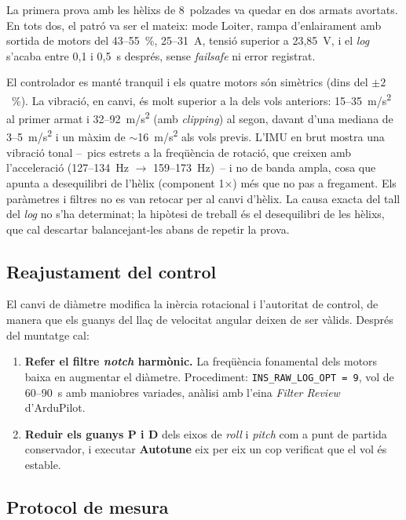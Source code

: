 La primera prova amb les hèlixs de 8~polzades va quedar en dos armats avortats. En tots dos, el patró va ser el mateix: mode Loiter, rampa d'enlairament amb sortida de motors del 43--55~\%, 25--31~A, tensió superior a 23,85~V, i el \emph{log} s'acaba entre 0,1 i 0,5~s després, sense \emph{failsafe} ni error registrat.

El controlador es manté tranquil i els quatre motors són simètrics (dins del $\pm 2$~\%). La vibració, en canvi, és molt superior a la dels vols anteriors: 15--35~m/s\textsuperscript{2} al primer armat i 32--92~m/s\textsuperscript{2} (amb \emph{clipping}) al segon, davant d'una mediana de 3--5~m/s\textsuperscript{2} i un màxim de $\sim$16~m/s\textsuperscript{2} als vols previs. L'IMU en brut mostra una vibració tonal --~pics estrets a la freqüència de rotació, que creixen amb l'acceleració (127--134~Hz $\rightarrow$ 159--173~Hz)~-- i no de banda ampla, cosa que apunta a desequilibri de l'hèlix (component 1$\times$) més que no pas a fregament. Els paràmetres i filtres no es van retocar per al canvi d'hèlix. La causa exacta del tall del \emph{log} no s'ha determinat; la hipòtesi de treball és el desequilibri de les hèlixs, que cal descartar balancejant-les abans de repetir la prova.

\subsection{Reajustament del control}
\label{subsec:propulsor-control}

El canvi de diàmetre modifica la inèrcia rotacional i l'autoritat de control, de manera que els guanys del llaç de velocitat angular deixen de ser vàlids. Després del muntatge cal:

\begin{enumerate}[label=\arabic*.]
    \item \textbf{Refer el filtre \emph{notch} harmònic.} La freqüència fonamental dels motors baixa en augmentar el diàmetre. Procediment: \texttt{INS\_RAW\_LOG\_OPT = 9}, vol de 60--90~s amb maniobres variades, anàlisi amb l'eina \emph{Filter Review} d'ArduPilot.
    \item \textbf{Reduir els guanys P i D} dels eixos de \emph{roll} i \emph{pitch} com a punt de partida conservador, i executar \textbf{Autotune} eix per eix un cop verificat que el vol és estable.
\end{enumerate}

\subsection{Protocol de mesura}
\label{subsec:propulsor-mesura}

